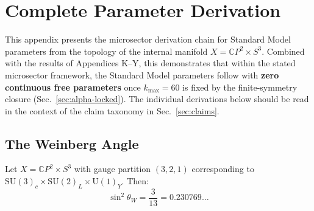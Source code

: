 
\section{Complete Parameter Derivation}\label{app:complete-params}

This appendix presents the microsector derivation chain for Standard Model parameters
from the topology of the internal manifold $X = \mathbb{C}P^2 \times S^3$.
Combined with the results of Appendices K--Y, this demonstrates that within the stated
microsector framework, the Standard Model parameters follow with \textbf{zero continuous free parameters} once $k_{\max}=60$ is fixed by the finite-symmetry closure (Sec.~\ref{sec:alpha-locked}).  The individual derivations below should be read in the context of the claim taxonomy in Sec.~\ref{sec:claims}.

\subsection{The Weinberg Angle}\label{app:weinberg-angle}

\begin{theorem}\label{thm:weinberg}
Let $X = \mathbb{C}P^2 \times S^3$ with gauge partition $(3,2,1)$ corresponding
to $\mathrm{SU}(3)_c \times \mathrm{SU}(2)_L \times \mathrm{U}(1)_Y$. Then:
\begin{equation}\label{eq:sin2-weinberg}
\boxed{\sin^2\theta_W = \frac{3}{13} = 0.230769\ldots}
\end{equation}
\end{theorem}

